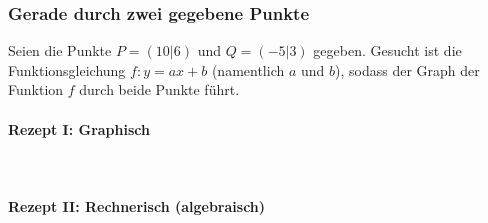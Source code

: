 
\subsubsection{Gerade durch zwei gegebene Punkte}

Seien die Punkte $P=(10|6)$ und $Q=(-5|3)$ gegeben.
Gesucht ist die Funktionsgleichung $f: y=ax+b$ (namentlich $a$ und $b$), sodass
der Graph der Funktion $f$ durch beide Punkte führt.


\paragraph{Rezept I: Graphisch}\,\\

\newpage


\paragraph{Rezept II: Rechnerisch (algebraisch)}\,\\

